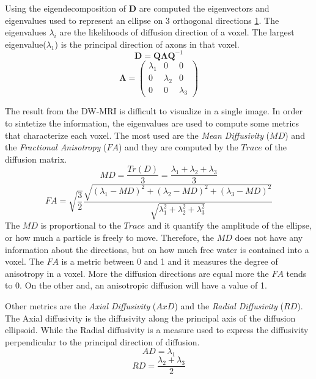 Using the eigendecomposition of $\mathbf{D}$ are computed the eigenvectors and eigenvalues used to represent an ellipse on 3 orthogonal directions \ref{fig:elipse}. The eigenvalues $\lambda_{i}$ are the likelihoods of diffusion direction of a voxel. The largest eigenvalue($\lambda_1$) is the principal direction of axons in that voxel.
 \[\mathbf{D}=\mathbf{Q}\mathbf{\Lambda}\mathbf{Q}^{-1}\]
 \begin{equation}
    \mathbf{\Lambda} = 
    \begin{pmatrix}
        \lambda_{1} & 0 & 0 \\
        0 & \lambda_{2} & 0 \\
        0 & 0 & \lambda_{3}
    \end{pmatrix}
 \end{equation}

 \begin{figure}[h]
    \centering
    \caption{}
    \label{fig:elipse}
 \end{figure}

 The result from the DW-MRI is difficult to visualize in a single image. In order to sintetize the information, the eigenvalues are used to compute some metrics that characterize each voxel. The most used are the \emph{Mean Diffusivity} ($MD$) and the \emph{Fractional Anisotropy} ($FA$) and they are computed by the $Trace$ of the diffusion matrix.
 \begin{equation}
    {MD} = \frac{{Tr}(D)}{3} = \frac{\lambda_1 + \lambda_2 + \lambda_3}{3}
 \end{equation}
 \begin{equation}
    FA = \sqrt{\frac{3}{2}}\frac{\sqrt{(\lambda_1-MD)^2+(\lambda_2-MD)^2+(\lambda_3-MD)^2}}{\sqrt{\lambda_1^2+\lambda_2^2+\lambda_3^2}}
 \end{equation}
 The $MD$ is proportional to the $Trace$ and it quantify the amplitude of the ellipse, or how much a particle is freely to move. Therefore, the $MD$ does not have any information about the directions, but on how much free water is contained into a voxel. The $FA$ is a metric between 0 and 1 and it measures the degree of anisotropy in a voxel. More the diffusion directions are equal more the $FA$ tends to 0. On the other and, an anisotropic diffusion will have a value of 1.
 
 Other metrics are the \emph{Axial Diffusivity} ($AxD$) and the \emph{Radial Diffusivity} ($RD$). The Axial diffusivity is the diffusivity along the principal axis of the diffusion ellipsoid. While the Radial diffusivity is a measure used to express the diffusivity perpendicular to the principal direction of diffusion.
 \begin{equation}
    AD = \lambda_1
 \end{equation}
 \begin{equation}
    RD = \frac{\lambda_2+\lambda_3}{2}
 \end{equation}


